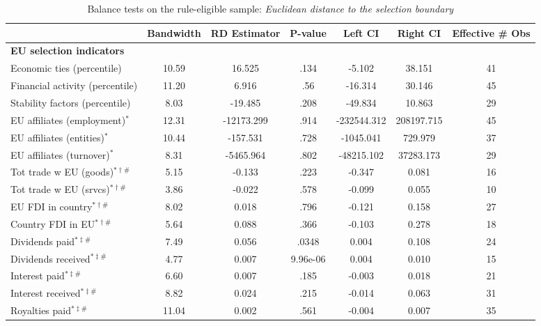 \begin{table}[htbp]\centering \caption{Balance tests on the rule-eligible sample: \emph{Euclidean distance to the selection boundary}\label{t:balanceEligDistance}} \begin{adjustbox}{width=1\textwidth} \begin{tabular}{l*{6}{c}} \toprule 
          &Bandwidth&RD Estimator&  P-value&  Left CI& Right CI&Effective \# Obs\\
\midrule
{\bf EU selection indicators}&         &         &         &         &         &         \\
Economic ties (percentile)&    10.59&   16.525&     .134&   -5.102&   38.151&       41\\
Financial activity (percentile)&    11.20&    6.916&      .56&  -16.314&   30.146&       45\\
Stability factors (percentile)&     8.03&  -19.485&     .208&  -49.834&   10.863&       29\\
EU affiliates (employment)\(^{*}\)&    12.31&-12173.299&     .914&-232544.312&208197.715&       45\\
EU affiliates (entities)\(^{*}\)&    10.44& -157.531&     .728&-1045.041&  729.979&       37\\
EU affiliates (turnover)\(^{*}\)&     8.31&-5465.964&     .802&-48215.102&37283.173&       29\\
Tot trade w EU (goods)\(^{*\dag\#}\)&     5.15&   -0.133&     .223&   -0.347&    0.081&       16\\
Tot trade w EU (srvcs)\(^{*\dag\#}\)&     3.86&   -0.022&     .578&   -0.099&    0.055&       10\\
EU FDI in country\(^{*\dagger\#}\)&     8.02&    0.018&     .796&   -0.121&    0.158&       27\\
Country FDI in EU\(^{*\dagger\#}\)&     5.64&    0.088&     .366&   -0.103&    0.278&       18\\
Dividends paid\(^{*\ddagger\#}\)&     7.49&    0.056&    .0348&    0.004&    0.108&       24\\
Dividends received\(^{*\ddagger\#}\)&     4.77&    0.007& 9.96e-06&    0.004&    0.010&       15\\
Interest paid\(^{*\ddagger\#}\)&     6.60&    0.007&     .185&   -0.003&    0.018&       21\\
Interest received\(^{*\ddagger\#}\)&     8.82&    0.024&     .215&   -0.014&    0.063&       31\\
Royalties paid\(^{*\ddagger\#}\)&    11.04&    0.002&     .561&   -0.004&    0.007&       35\\

\end{tabular}
\end{adjustbox}
\end{table}
